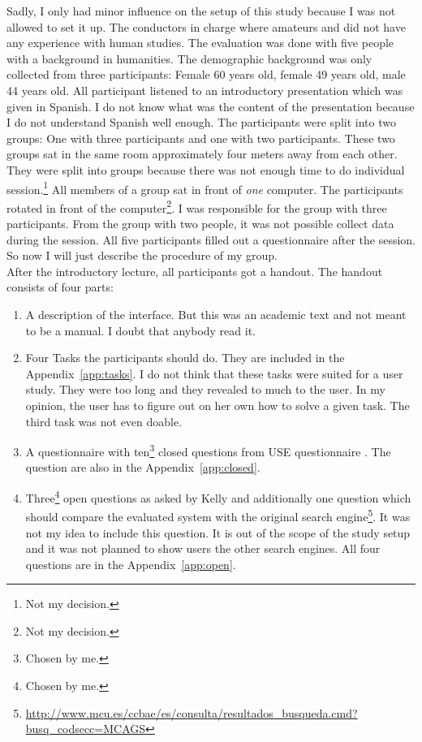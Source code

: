 \documentclass[11pt]{report}
\begin{document}
Sadly, I only had minor influence on the setup of this study because I was not allowed to set it up. The conductors in charge where amateurs and did not have any experience with human studies. The evaluation was done with five people with a background in humanities. The demographic background was only collected from three participants: Female 60 years old, female 49 years old, male 44 years old. All participant listened to an introductory presentation which was given in Spanish. I do not know what was the content of the presentation because I do not understand Spanish well enough. The participants were split into two groups: One with three participants and one with two participants. These two groups sat in the same room approximately four meters away from each other. They were split into groups because there was not enough time to do individual session.\footnote{Not my decision.} All members of a group sat in front of \textit{one} computer. The participants rotated in front of the computer\footnote{Not my decision.}. I was responsible for the group with three participants. From the group with two people, it was not possible collect data during the session. All five participants filled out a questionnaire after the session. So now I will just describe the procedure of my group. \\

	After the introductory lecture, all participants got a handout. The handout consists of four parts:
\begin{enumerate}
	\item A description of the interface. But this was an academic text and not meant to be a manual. I doubt that anybody read it.
	\item Four Tasks the participants should do. They are included in the Appendix~\ref{app:tasks}. I do not think that these tasks were suited for a user study. They were too long and they revealed to much to the user. In my opinion, the user has to figure out on her own how to solve a given task. The third task was not even doable.
	\item A questionnaire with ten\footnote{Chosen by me.} closed questions from USE questionnaire \cite{lund2001measuring}. The question are also in the Appendix~\ref{app:closed}.
	\item Three\footnote{Chosen by me.} open questions as asked by Kelly \cite{Kelly2008} and additionally one question which should compare the evaluated system with the original search engine\footnote{\url{http://www.mcu.es/ccbae/es/consulta/resultados_busqueda.cmd?busq_codsecc=MCAGS}}. It was not my idea to include this question. It is out of the scope of the study setup and it was not planned to show users the other search engines. All four questions are in the Appendix~\ref{app:open}.
\end{enumerate}
\end{document}

